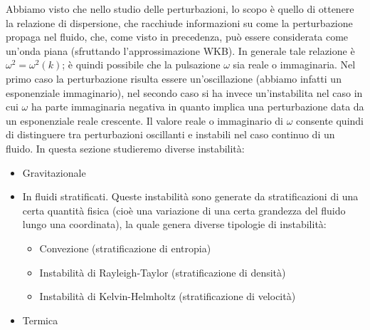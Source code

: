 Abbiamo visto che nello studio delle perturbazioni, lo scopo è quello di ottenere la relazione di dispersione, che racchiude informazioni su come la perturbazione propaga nel fluido, che, come visto in precedenza, può essere considerata come un'onda piana (sfruttando l'approssimazione WKB). In generale tale relazione è $\omega^2 = \omega^2 (k)$; è quindi possibile che la pulsazione $\omega$ sia reale o immaginaria. Nel primo caso la perturbazione risulta essere un'oscillazione (abbiamo infatti un esponenziale immaginario), nel secondo caso si ha invece un'instabilita nel caso in cui $\omega$ ha parte immaginaria negativa in quanto implica una perturbazione data da un esponenziale reale crescente. Il valore reale o immaginario di $\omega$ consente quindi di distinguere tra perturbazioni oscillanti e instabili nel caso continuo di un fluido. In questa sezione studieremo diverse instabilità:
\begin{itemize}
\item Gravitazionale
\item In fluidi stratificati. Queste instabilità sono generate da stratificazioni di una certa quantità fisica (cioè una variazione di una certa grandezza del fluido lungo una coordinata), la quale genera diverse tipologie di instabilità:
\begin{itemize}
\item Convezione (stratificazione di entropia)
\item Instabilità di Rayleigh-Taylor (stratificazione di densità)
\item Instabilità di Kelvin-Helmholtz (stratificazione di velocità)
\end{itemize}
\item Termica
\end{itemize}

